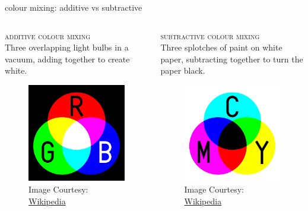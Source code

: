 \documentclass[aspectratio=169,xcolor={dvipsnames,svgnames}]{beamer}
\begin{document}
\begin{frame}[label={sec:orgf83cb5a}]{colour mixing: additive vs subtractive}
\begin{columns}
\begin{column}{.5\columnwidth}
\textsc{additive colour mixing} \\[0pt]
Three overlapping light bulbs in a vacuum, adding
together to create white.

\begin{figure}[htbp]
\centering
\includegraphics[width=0.6\linewidth]{images/AdditiveColor.svg.png}
\caption{Image Courtesy: \href{https://en.wikipedia.org/wiki/File:AdditiveColor.svg}{Wikipedia}}
\end{figure}
\end{column}
\begin{column}{.5\columnwidth}
\textsc{subtractive colour mixing} \\[0pt]
Three splotches of paint on white paper, subtracting
together to turn the paper black.

\begin{figure}[htbp]
\centering
\includegraphics[width=0.6\linewidth]{images/SubtractiveColor.svg.png}
\caption{Image Courtesy: \href{https://en.wikipedia.org/wiki/File:SubtractiveColor.svg}{Wikipedia}}
\end{figure}
\end{column}
\end{columns}
\end{frame}
\end{document}
